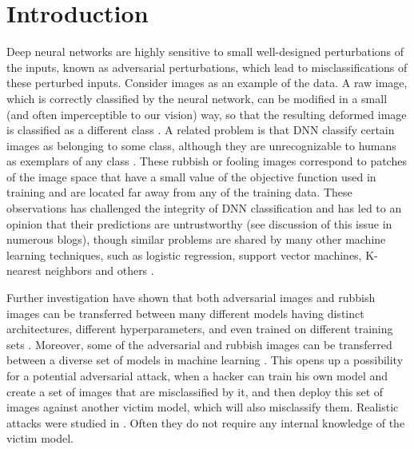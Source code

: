 \title{}

\begin{abstract}

\end{abstract}

\section{Introduction}
Deep neural networks are highly sensitive to small well-designed perturbations of the inputs, known as adversarial perturbations, which lead to misclassifications of these perturbed inputs. Consider images as an example of the data. A raw image, which is correctly classified by the neural network, can be modified in a small (and often imperceptible to our vision) way, so that the resulting deformed image is classified as a different class \cite{Szegedy}. A related problem is that DNN classify certain images as belonging to some class, although they are unrecognizable to humans as exemplars of any class \cite{Nguyen}. These rubbish or fooling images correspond to patches of the image space that have a small value of the objective function used in training and are located far away from any of the training data. These observations has challenged the integrity of DNN classification and has led to an opinion that their predictions are untrustworthy (see discussion of this issue in numerous blogs), though similar problems are shared by many other machine learning techniques, such as logistic regression, support vector machines, K-nearest neighbors and others \cite{transferability}.  

Further investigation have shown that both adversarial images and rubbish images can be transferred between many different models having distinct architectures, different hyperparameters, and even trained on different training sets \cite{Szegedy,Nguyen}. Moreover, some of the adversarial and rubbish images can be transferred between a diverse set of models in machine learning \cite{transferability}. This opens up a possibility for a potential adversarial attack, when a hacker can train his own model and create a set of images that are misclassified by it, and then deploy this set of images against another victim model, which will also misclassify them. Realistic attacks were studied in \cite{transferability,practical_attack,Kurakin}. Often they do not require any internal knowledge of the victim model. 


